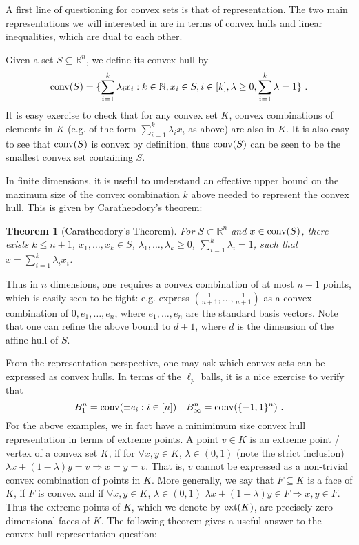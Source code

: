 \documentclass[11pt]{article}
\newtheorem{theorem}{Theorem}
\theoremstyle{plain}
\theoremstyle{plain}
\newcommand{\set}[1]{\{{#1}\}}
\newcommand{\R}{\ensuremath{\mathbb{R}}}
\newcommand{\N}{\ensuremath{\mathbb{N}}}
\begin{document}
A first line of questioning for convex sets is that of representation. The two
main representations we will interested in are in terms of convex hulls and
linear inequalities, which are dual to each other. 

Given a set $S \subseteq \R^n$, we define its convex hull by
\begin{equation}
\label{def:conv} 
{\rm conv}(S) = \set{\sum_{i=1}^k \lambda_i x_i: k \in \N, x_i
\in S, i \in [k], \lambda \geq 0, \sum_{i=1}^k \lambda = 1} \text{ .}
\end{equation}
It is easy exercise to check that for any convex set $K$, convex combinations of
elements in $K$ (e.g. of the form $\sum_{i=1}^k \lambda_i x_i$ as above) are
also in $K$. It is also easy to see that ${\rm conv}(S)$ is convex by
definition, thus ${\rm conv}(S)$ can be seen to be the smallest convex set
containing $S$.

In finite dimensions, it is useful to understand an effective upper bound on the
maximum size of the convex combination $k$ above needed to represent the convex
hull. This is given by Caratheodory's theorem: 

\begin{theorem}[Caratheodory's Theorem] 
For $S \subset \R^n$ and $x \in {\rm conv}(S)$, there exists $k \leq n+1$,
$x_1,\dots,x_k \in S$, $\lambda_1,\dots,\lambda_k \geq 0$, $\sum_{i=1}^k
\lambda_i = 1$, such that $x = \sum_{i=1}^k \lambda_i x_i$.  
\end{theorem}

Thus in $n$ dimensions, one requires a convex combination of at most $n+1$
points, which is easily seen to be tight: e.g. express
$(\frac{1}{n+1},\dots,\frac{1}{n+1})$ as a convex combination of
$0,e_1,\dots,e_n$, where $e_1,\dots,e_n$ are the standard basis vectors. Note
that one can refine the above bound to $d+1$, where $d$ is the dimension of the
affine hull of $S$.

From the representation perspective, one may ask which convex sets can be
expressed as convex hulls. In terms of the $\ell_p$ balls, it is a nice exercise
to verify that
\[
B_1^n = {\rm conv}(\pm e_i: i \in [n]) \quad B_\infty^n = {\rm conv}(\{-1,1\}^n) \text{ .}
\] 
For the above examples, we in fact have a minimimum size convex hull
representation in terms of extreme points. A point $v \in K$ is an extreme point
/ vertex of a convex set $K$, if for $\forall x,y \in K$, $\lambda \in (0,1)$
(note the strict inclusion) $\lambda x + (1-\lambda) y = v \Rightarrow x=y=v$.
That is, $v$ cannot be expressed as a non-trivial convex combination of points
in $K$.  More generally, we say that $F \subseteq K$ is a face of $K$, if $F$ is
convex and if $\forall x,y \in K$, $\lambda \in (0,1)$ $\lambda x + (1-\lambda)
y \in F \Rightarrow x,y \in F$. Thus the extreme points of $K$, which we denote
by ${\rm ext}(K)$, are precisely zero dimensional faces of $K$. The following
theorem gives a useful answer to the convex hull representation question:
\end{document}
